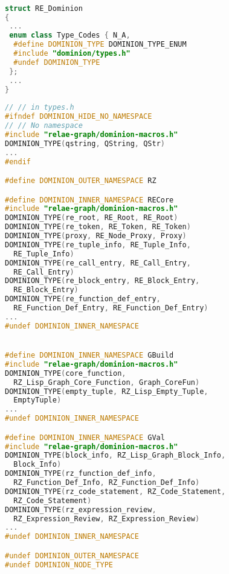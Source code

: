 \begin{lstlisting}[caption={Asserting Vertex Types}, 
  language = C++, numbers = none, escapechar = !,label={lst:dominion-types},
    basicstyle = \ttfamily\bfseries\footnotesize, linewidth = \linewidth]

struct RE_Dominion
{
 ...
 enum class Type_Codes { N_A,
  #define DOMINION_TYPE DOMINION_TYPE_ENUM
  #include "dominion/types.h"
  #undef DOMINION_TYPE
 };
 ...
}
 
// // in types.h
#ifndef DOMINION_HIDE_NO_NAMESPACE
// // No namespace
#include "relae-graph/dominion-macros.h"
DOMINION_TYPE(qstring, QString, QStr)
...
#endif

#define DOMINION_OUTER_NAMESPACE RZ

#define DOMINION_INNER_NAMESPACE RECore
#include "relae-graph/dominion-macros.h"
DOMINION_TYPE(re_root, RE_Root, RE_Root)
DOMINION_TYPE(re_token, RE_Token, RE_Token)
DOMINION_TYPE(proxy, RE_Node_Proxy, Proxy)
DOMINION_TYPE(re_tuple_info, RE_Tuple_Info, 
  RE_Tuple_Info)
DOMINION_TYPE(re_call_entry, RE_Call_Entry, 
  RE_Call_Entry)
DOMINION_TYPE(re_block_entry, RE_Block_Entry, 
  RE_Block_Entry)
DOMINION_TYPE(re_function_def_entry, 
  RE_Function_Def_Entry, RE_Function_Def_Entry)
...
#undef DOMINION_INNER_NAMESPACE


#define DOMINION_INNER_NAMESPACE GBuild
#include "relae-graph/dominion-macros.h"
DOMINION_TYPE(core_function, 
  RZ_Lisp_Graph_Core_Function, Graph_CoreFun)
DOMINION_TYPE(empty_tuple, RZ_Lisp_Empty_Tuple, 
  EmptyTuple)
...
#undef DOMINION_INNER_NAMESPACE

#define DOMINION_INNER_NAMESPACE GVal
#include "relae-graph/dominion-macros.h"
DOMINION_TYPE(block_info, RZ_Lisp_Graph_Block_Info, 
  Block_Info)
DOMINION_TYPE(rz_function_def_info, 
  RZ_Function_Def_Info, RZ_Function_Def_Info)
DOMINION_TYPE(rz_code_statement, RZ_Code_Statement, 
  RZ_Code_Statement)
DOMINION_TYPE(rz_expression_review, 
  RZ_Expression_Review, RZ_Expression_Review)
...
#undef DOMINION_INNER_NAMESPACE

#undef DOMINION_OUTER_NAMESPACE
#undef DOMINION_NODE_TYPE

\end{lstlisting}

